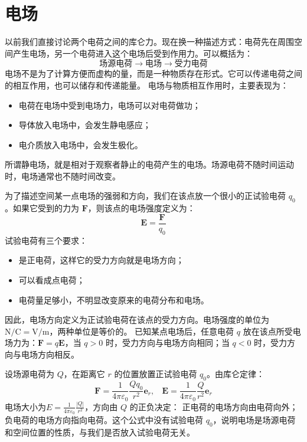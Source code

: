 \documentclass[lang=cn,11pt]{elegantbook}
\begin{document}
\section{电场}

以前我们直接讨论两个电荷之间的库仑力。现在换一种描述方式：电荷先在周围空间产生电场，另一个电荷进入这个电场后受到作用力。可以概括为：
\[
\text{场源电荷}\longrightarrow\text{电场}\longrightarrow\text{受力电荷}
\]
电场不是为了计算方便而虚构的量，而是一种物质存在形式。它可以传递电荷之间的相互作用，也可以储存和传递能量。
电场与物质相互作用时，主要表现为：
\begin{itemize}
\item 电荷在电场中受到电场力，电场可以对电荷做功；
\item 导体放入电场中，会发生静电感应；
\item 电介质放入电场中，会发生极化。
\end{itemize}
所谓静电场，就是相对于观察者静止的电荷产生的电场。场源电荷不随时间运动时，电场通常也不随时间改变。

\begin{definition}[电场强度]
为了描述空间某一点电场的强弱和方向，我们在该点放一个很小的正试验电荷 \(q_0\)。如果它受到的力为 \(\mathbf F\)，则该点的电场强度定义为：\[
\boxed{\mathbf E=\frac{\mathbf F}{q_0}}
\]试验电荷有三个要求：
\begin{itemize}
  \item 是正电荷，这样它的受力方向就是电场方向；
  \item 可以看成点电荷；
  \item 电荷量足够小，不明显改变原来的电荷分布和电场。
\end{itemize}
因此，电场方向定义为正试验电荷在该点的受力方向。电场强度的单位为\(\mathrm{N/C}=\mathrm{V/m}\)，两种单位是等价的。
已知某点电场后，任意电荷 \(q\) 放在该点所受电场力为：\(\boxed{\mathbf F=q\mathbf E}\)，当 \(q>0\) 时，受力方向与电场方向相同；当 \(q<0\) 时，受力方向与电场方向相反。
\end{definition}

\begin{definition}[点电荷产生的电场]
  设场源电荷为 \(Q\)，在距离它 \(r\) 的位置放置正试验电荷 \(q_0\)。由库仑定律：
\[
\mathbf F=\frac{1}{4\pi\varepsilon_0}
\frac{Qq_0}{r^2}\mathbf e_r,~~~~\boxed{\mathbf E=
\frac{1}{4\pi\varepsilon_0}
\frac{Q}{r^2}\mathbf e_r}\]
电场大小为\(E=\frac{1}{4\pi\varepsilon_0}\frac{|Q|}{r^2}\)，方向由 \(Q\) 的正负决定：
正电荷的电场方向由电荷向外；负电荷的电场方向指向电荷。这个公式中没有试验电荷 \(q_0\)，说明电场是场源电荷和空间位置的性质，与我们是否放入试验电荷无关。
\end{definition}
\end{document}
